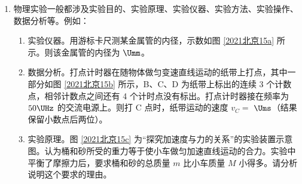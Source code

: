 \documentclass[\gkver]{gaokaozhenti}
\begin{document}
\begin{enumerate}
{用同步辐射光照射氢原子，不能使氢原子电离}
{蛋白质分子的线度约为 $10^{-8}\Um$，不能用同步辐射光得到其衍射图样}
{尽管向外辐射能量，但电子回旋一圈后能量不会明显减小}


\item
物理实验一般都涉及实验目的、实验原理、实验仪器、实验方法、实验操作、数据分析等。例如：

\begin{enumerate}
	\item
	实验仪器。用游标卡尺测某金属管的内径，示数如图 \ref{2021北京15a} 所示。则该金属管的内径为  $\Umm$。


	\item
	数据分析。打点计时器在随物体做匀变速直线运动的纸带上打点，其中一部分如图 \ref{2021北京15b} 所示，B、C、D 为纸带上标出的连续 3 个计数点，相邻计数点之间还有 4 个计时点没有标出。打点计时器接在频率为 $50\UHz$ 的交流电源上。则打 C 点时，纸带运动的速度 $v_{C} =$  $\Ums$（结果保留小数点后两位）。


	\item
	实验原理。图 \ref{2021北京15c} 为“探究加速度与力的关系”的实验装置示意图。认为桶和砂所受的重力等于使小车做匀加速直线运动的合力。实验中平衡了摩擦力后，要求桶和砂的总质量 $m$ 比小车质量 $M$ 小得多。请分析说明这个要求的理由。

\end{enumerate}


\end{enumerate}
\end{document}
